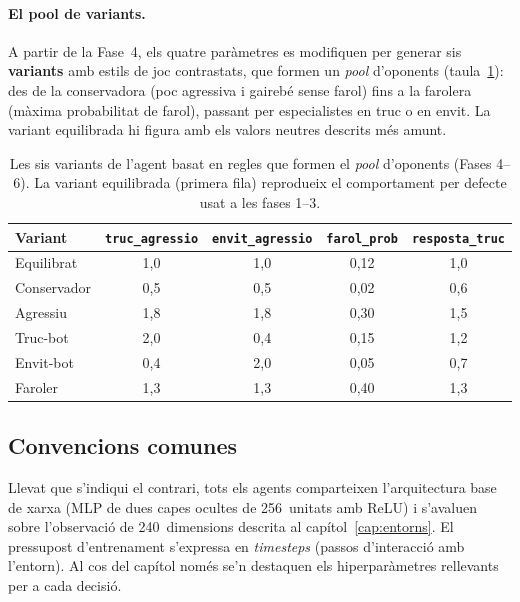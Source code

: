 \paragraph{El pool de variants.} A partir de la Fase~4, els quatre paràmetres es
modifiquen per generar sis \textbf{variants} amb estils de joc contrastats, que formen un
\emph{pool} d'oponents (taula~\ref{tab:pool-variants}): des de la conservadora (poc
agressiva i gairebé sense farol) fins a la farolera (màxima probabilitat de farol),
passant per especialistes en truc o en envit. La variant equilibrada hi figura amb els
valors neutres descrits més amunt.

\begin{table}[H]
  \centering
  \begin{tabular}{lcccc}
    \toprule
    Variant & \texttt{truc\_agressio} & \texttt{envit\_agressio} & \texttt{farol\_prob} & \texttt{resposta\_truc} \\
    \midrule
    Equilibrat  & 1{,}0 & 1{,}0 & 0{,}12 & 1{,}0 \\
    Conservador & 0{,}5 & 0{,}5 & 0{,}02 & 0{,}6 \\
    Agressiu    & 1{,}8 & 1{,}8 & 0{,}30 & 1{,}5 \\
    Truc-bot    & 2{,}0 & 0{,}4 & 0{,}15 & 1{,}2 \\
    Envit-bot   & 0{,}4 & 2{,}0 & 0{,}05 & 0{,}7 \\
    Faroler     & 1{,}3 & 1{,}3 & 0{,}40 & 1{,}3 \\
    \bottomrule
  \end{tabular}
  \caption[Les sis variants de l'agent basat en regles.]{Les sis variants de l'agent basat en regles que formen el \emph{pool}
           d'oponents (Fases 4--6). La variant equilibrada (primera fila) reprodueix el
           comportament per defecte usat a les fases 1--3.}
  \label{tab:pool-variants}
\end{table}

\subsection*{Convencions comunes}

Llevat que s'indiqui el contrari, tots els agents comparteixen l'arquitectura base de
xarxa (\ac{MLP} de dues capes ocultes de 256~unitats amb ReLU) i s'avaluen sobre
l'observació de 240~dimensions descrita al capítol~\ref{cap:entorns}. El pressupost
d'entrenament s'expressa en \emph{timesteps} (passos d'interacció amb l'entorn).
Al cos del capítol només se'n destaquen els hiperparàmetres rellevants per a cada decisió.




